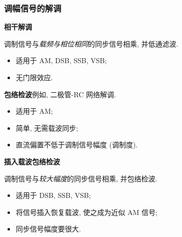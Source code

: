 \subsubsection{调幅信号的解调}
\textbf{相干解调}

调制信号与\textit{载频与相位相同}的同步信号相乘, 并低通滤波.
\begin{itemize}
    \item 适用于 AM, DSB, SSB, VSB;
    \item 无门限效应.
\end{itemize}

\textbf{包络检波}\quad 例如, 二极管-RC 网络解调.
\begin{itemize}
    \item 适用于 AM;
    \item 简单, 无需载波同步;
    \item 直流偏置不低于调制信号幅度 (调制度).
\end{itemize}

\textbf{插入载波包络检波}

调制信号与\textit{较大幅度}的同步信号相乘, 并包络检波.
\begin{itemize}
    \item 适用于 DSB, SSB, VSB;
    \item 将信号插入恢复载波, 使之成为近似 AM 信号;
    \item 同步信号幅度要很大.
\end{itemize}
